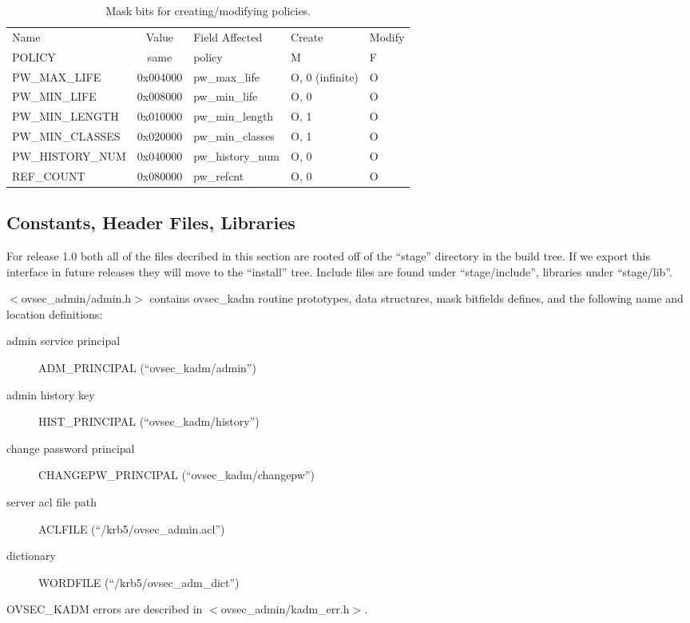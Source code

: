 \begin{table}[htbp]
\begin{tabular}{@{}lclll}
Name & Value & Field Affected & Create & Modify \\
POLICY                  & same     & policy & M & F \\
PW_MAX_LIFE             & 0x004000 & pw_max_life & O, 0 (infinite) & O \\
PW_MIN_LIFE             & 0x008000 & pw_min_life & O, 0 & O \\
PW_MIN_LENGTH           & 0x010000 & pw_min_length & O, 1 & O \\
PW_MIN_CLASSES          & 0x020000 & pw_min_classes & O, 1 & O \\
PW_HISTORY_NUM          & 0x040000 & pw_history_num & O, 0 & O \\
REF_COUNT               & 0x080000 & pw_refcnt & O, 0 & O 
\end{tabular}
\caption{Mask bits for creating/modifying policies.}
\label{tab:policy-bits}
\end{table}

\subsection{Constants, Header Files, Libraries}

For release 1.0 both all of the files decribed in this section are
rooted off of the ``stage'' directory in the build tree.  If we export
this interface in future releases they will move to the ``install''
tree. Include files are found under ``stage/include'', libraries under
``stage/lib''.

$<$ovsec_admin/admin.h$>$ contains ovsec_kadm routine prototypes, data
structures, mask bitfields defines, and the following name and
location definitions:

\begin{description}
\item[admin service principal] ADM_PRINCIPAL (``ovsec_kadm/admin'')
\item[admin history key] HIST_PRINCIPAL (``ovsec_kadm/history'')
\item[change password principal] CHANGEPW_PRINCIPAL (``ovsec_kadm/changepw'')
\item[server acl file path] ACLFILE (``/krb5/ovsec_admin.acl'')
\item[dictionary] WORDFILE (``/krb5/ovsec_adm_dict'')
\end{description}

OVSEC_KADM errors are described in $<$ovsec_admin/kadm_err.h$>$.


